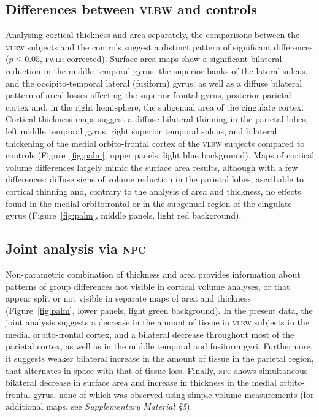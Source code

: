 \subsection{Differences between \textsc{vlbw} and controls}

Analysing cortical thickness and area separately, the comparisons between the \textsc{vlbw} subjects and the controls suggest a distinct pattern of significant differences ($p \leqslant 0.05$, \textsc{fwer}-corrected). Surface area maps show a significant bilateral reduction in the middle temporal gyrus, the superior banks of the lateral sulcus, and the occipito-temporal lateral (fusiform) gyrus, as well as a diffuse bilateral pattern of areal losses affecting the superior frontal gyrus, posterior parietal cortex and, in the right hemisphere, the subgenual area of the cingulate cortex. Cortical thickness maps suggest a diffuse bilateral thinning in the parietal lobes, left middle temporal gyrus, right superior temporal sulcus, and bilateral thickening of the medial orbito-frontal cortex of the \textsc{vlbw} subjects compared to controls (Figure~\ref{fig:palm}, upper panels, light blue background). Maps of cortical volume differences largely mimic the surface area results, although with a few differences: diffuse signs of volume reduction in the parietal lobes, ascribable to cortical thinning and, contrary to the analysis of area and thickness, no effects found in the medial-orbitofrontal or in the subgenual region of the cingulate gyrus (Figure~\ref{fig:palm}, middle panels, light red background).

\subsection{Joint analysis via \textsc{npc}}

Non-parametric combination of thickness and area provides information about patterns of group differences not visible in cortical volume analyses, or that appear split or not visible in separate maps of area and thickness (Figure~\ref{fig:palm}, lower panels, light green background). In the present data, the joint analysis suggests a decrease in the amount of tissue in \textsc{vlbw} subjects in the medial orbito-frontal cortex, and a bilateral decrease throughout most of the parietal cortex, as well as in the middle temporal and fusiform gyri. Furthermore, it suggests weaker bilateral increase in the amount of tissue in the parietal region, that alternates in space with that of tissue loss. Finally, \textsc{npc} shows simultaneous bilateral decrease in surface area and increase in thickness in the medial orbito-frontal gyrus, none of which was observed using simple volume measurements (for additional maps, see \emph{Supplementary Material §5}).


